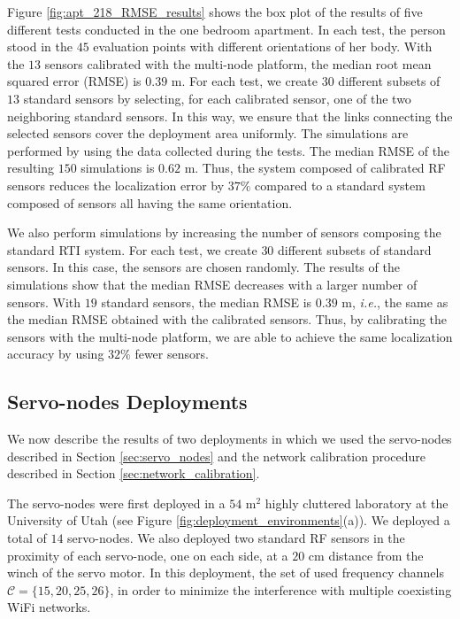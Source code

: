 \documentclass[conference]{IEEEtran}
\begin{document}
Figure \ref{fig:apt_218_RMSE_results} shows the box plot of the results of five different tests conducted in the one bedroom apartment. In each test, the person stood in the $45$ evaluation points with different orientations of her body. With the $13$ sensors calibrated with the multi-node platform, the median root mean squared error (RMSE) is $0.39$ m. For each test, we create $30$ different subsets of $13$ standard sensors by selecting, for each calibrated sensor, one of the two neighboring standard sensors. In this way, we ensure that the links connecting the selected sensors cover the deployment area uniformly. The simulations are performed by using the data collected during the tests. The median RMSE of the resulting $150$ simulations is $0.62$ m. Thus, the system composed of calibrated RF sensors reduces the localization error by $37\%$ compared to a standard system composed of sensors all having the same orientation.

We also perform simulations by increasing the number of sensors composing the standard RTI system. For each test, we create  $30$ different subsets of standard sensors. In this case, the sensors are chosen randomly. The results of the simulations show that the median RMSE decreases with a larger number of sensors. With $19$ standard sensors, the median RMSE is $0.39$ m, \emph{i.e.}, the same as the median RMSE obtained with the calibrated sensors. Thus, by calibrating the sensors with the multi-node platform, we are able to achieve the same localization accuracy by using $32\%$ fewer sensors.



\subsection{Servo-nodes Deployments}
\label{sec:servo_nodes_deployments}

We now describe the results of two deployments in which we used the servo-nodes described in Section \ref{sec:servo_nodes} and the network calibration procedure described in Section \ref{sec:network_calibration}.

The servo-nodes were first deployed in a $54$ m$^2$ highly cluttered laboratory at the University of Utah (see Figure \ref{fig:deployment_environments}(a)). We deployed a total of $14$ servo-nodes. We also deployed two standard RF sensors in the proximity of each servo-node, one on each side, at a $20$ cm distance from the winch of the servo motor. In this deployment, the set of used frequency channels $\mathcal{C} = \{15,20,25,26\}$, in order to minimize the interference with multiple coexisting WiFi networks.
\end{document}
